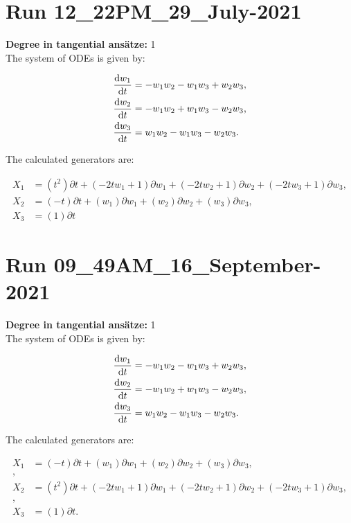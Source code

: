 \section*{Run 12\_22PM\_29\_July-2021}
\textbf{Degree in tangential ansätze:}	1\\
The system of ODEs is given by:

\begin{align*}
\dv{w_{1}}{t}&=- w_{1} w_{2} - w_{1} w_{3} + w_{2} w_{3},\\
\dv{w_{2}}{t}&=- w_{1} w_{2} + w_{1} w_{3} - w_{2} w_{3},\\
\dv{w_{3}}{t}&=w_{1} w_{2} - w_{1} w_{3} - w_{2} w_{3}.\\
\end{align*}

\noindent The calculated generators are:

\begin{align*}
X_{1}&=\left( t^{2} \right)\partial t+\left( - 2 t w_{1} + 1 \right)\partial w_{1}+\left( - 2 t w_{2} + 1 \right)\partial w_{2}+\left( - 2 t w_{3} + 1 \right)\partial w_{3},\\
X_{2}&=\left( - t \right)\partial t+\left( w_{1} \right)\partial w_{1}+\left( w_{2} \right)\partial w_{2}+\left( w_{3} \right)\partial w_{3},\\
X_{3}&=\left( 1 \right)\partial t\end{align*}
\section*{Run 09\_49AM\_16\_September-2021}
\textbf{Degree in tangential ansätze:}	1\\
The system of ODEs is given by:

\begin{align*}
\dv{w_{1}}{t}&=- w_{1} w_{2} - w_{1} w_{3} + w_{2} w_{3},\\
\dv{w_{2}}{t}&=- w_{1} w_{2} + w_{1} w_{3} - w_{2} w_{3},\\
\dv{w_{3}}{t}&=w_{1} w_{2} - w_{1} w_{3} - w_{2} w_{3}.\\
\end{align*}

\noindent The calculated generators are:

\begin{align*}
X_{1}&=\left( - t \right)\partial t+\left( w_{1} \right)\partial w_{1}+\left( w_{2} \right)\partial w_{2}+\left( w_{3} \right)\partial w_{3},\\
,\\
X_{2}&=\left( t^{2} \right)\partial t+\left( - 2 t w_{1} + 1 \right)\partial w_{1}+\left( - 2 t w_{2} + 1 \right)\partial w_{2}+\left( - 2 t w_{3} + 1 \right)\partial w_{3},\\
,\\
X_{3}&=\left( 1 \right)\partial t.\\
\end{align*}
